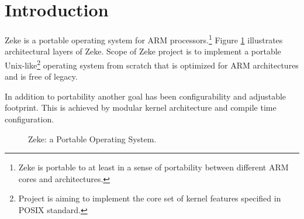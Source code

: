 \part{Introduction}

Zeke is a portable operating system for ARM processors.\footnote{Zeke is
portable to at least in a sense of portability between different ARM cores
and architectures.} Figure \ref{figure:zeke} illustrates architectural layers
of Zeke. Scope of Zeke project is to implement a portable
Unix-like\footnote{Project is aiming to implement the core set of kernel
features specified in \ac{POSIX} standard.} operating system from scratch that
is optimized for ARM architectures and is free of legacy.

In addition to portability another goal has been configurability and adjustable
footprint. This is achieved by modular kernel architecture and compile time
configuration.

\begin{figure}
  
  \centering
  \caption{Zeke: a Portable Operating System.}
  \label{figure:zeke}
\end{figure}


